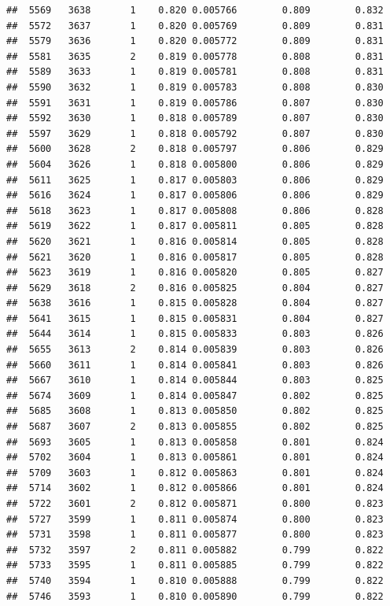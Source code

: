 \documentclass[
]{book}
\begin{document}
\begin{verbatim}
##  5569   3638       1    0.820 0.005766        0.809        0.832
##  5572   3637       1    0.820 0.005769        0.809        0.831
##  5579   3636       1    0.820 0.005772        0.809        0.831
##  5581   3635       2    0.819 0.005778        0.808        0.831
##  5589   3633       1    0.819 0.005781        0.808        0.831
##  5590   3632       1    0.819 0.005783        0.808        0.830
##  5591   3631       1    0.819 0.005786        0.807        0.830
##  5592   3630       1    0.818 0.005789        0.807        0.830
##  5597   3629       1    0.818 0.005792        0.807        0.830
##  5600   3628       2    0.818 0.005797        0.806        0.829
##  5604   3626       1    0.818 0.005800        0.806        0.829
##  5611   3625       1    0.817 0.005803        0.806        0.829
##  5616   3624       1    0.817 0.005806        0.806        0.829
##  5618   3623       1    0.817 0.005808        0.806        0.828
##  5619   3622       1    0.817 0.005811        0.805        0.828
##  5620   3621       1    0.816 0.005814        0.805        0.828
##  5621   3620       1    0.816 0.005817        0.805        0.828
##  5623   3619       1    0.816 0.005820        0.805        0.827
##  5629   3618       2    0.816 0.005825        0.804        0.827
##  5638   3616       1    0.815 0.005828        0.804        0.827
##  5641   3615       1    0.815 0.005831        0.804        0.827
##  5644   3614       1    0.815 0.005833        0.803        0.826
##  5655   3613       2    0.814 0.005839        0.803        0.826
##  5660   3611       1    0.814 0.005841        0.803        0.826
##  5667   3610       1    0.814 0.005844        0.803        0.825
##  5674   3609       1    0.814 0.005847        0.802        0.825
##  5685   3608       1    0.813 0.005850        0.802        0.825
##  5687   3607       2    0.813 0.005855        0.802        0.825
##  5693   3605       1    0.813 0.005858        0.801        0.824
##  5702   3604       1    0.813 0.005861        0.801        0.824
##  5709   3603       1    0.812 0.005863        0.801        0.824
##  5714   3602       1    0.812 0.005866        0.801        0.824
##  5722   3601       2    0.812 0.005871        0.800        0.823
##  5727   3599       1    0.811 0.005874        0.800        0.823
##  5731   3598       1    0.811 0.005877        0.800        0.823
##  5732   3597       2    0.811 0.005882        0.799        0.822
##  5733   3595       1    0.811 0.005885        0.799        0.822
##  5740   3594       1    0.810 0.005888        0.799        0.822
##  5746   3593       1    0.810 0.005890        0.799        0.822

\end{verbatim}
\end{document}
